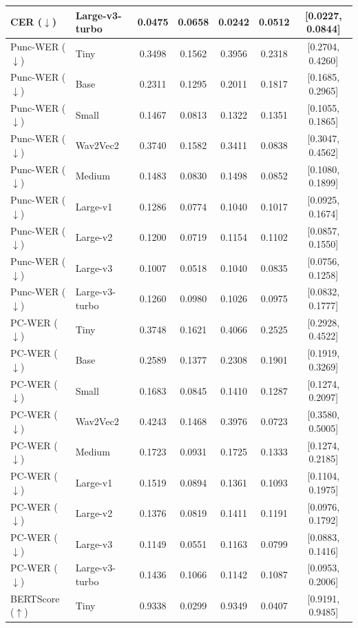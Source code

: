 \begin{table}[!t]
\begin{tabular}{llccccc}
CER ($\downarrow$) & Large-v3-turbo & 0.0475 & 0.0658 & 0.0242 & 0.0512 & [0.0227, 0.0844] \\
\midrule
Punc-WER ($\downarrow$) & Tiny & 0.3498 & 0.1562 & 0.3956 & 0.2318 & [0.2704, 0.4260] \\
Punc-WER ($\downarrow$) & Base & 0.2311 & 0.1295 & 0.2011 & 0.1817 & [0.1685, 0.2965] \\
Punc-WER ($\downarrow$) & Small & 0.1467 & 0.0813 & 0.1322 & 0.1351 & [0.1055, 0.1865] \\
Punc-WER ($\downarrow$) & Wav2Vec2 & 0.3740 & 0.1582 & 0.3411 & 0.0838 & [0.3047, 0.4562] \\
Punc-WER ($\downarrow$) & Medium & 0.1483 & 0.0830 & 0.1498 & 0.0852 & [0.1080, 0.1899] \\
Punc-WER ($\downarrow$) & Large-v1 & 0.1286 & 0.0774 & 0.1040 & 0.1017 & [0.0925, 0.1674] \\
Punc-WER ($\downarrow$) & Large-v2 & 0.1200 & 0.0719 & 0.1154 & 0.1102 & [0.0857, 0.1550] \\
Punc-WER ($\downarrow$) & Large-v3 & 0.1007 & 0.0518 & 0.1040 & 0.0835 & [0.0756, 0.1258] \\
Punc-WER ($\downarrow$) & Large-v3-turbo & 0.1260 & 0.0980 & 0.1026 & 0.0975 & [0.0832, 0.1777] \\
\midrule
PC-WER ($\downarrow$) & Tiny & 0.3748 & 0.1621 & 0.4066 & 0.2525 & [0.2928, 0.4522] \\
PC-WER ($\downarrow$) & Base & 0.2589 & 0.1377 & 0.2308 & 0.1901 & [0.1919, 0.3269] \\
PC-WER ($\downarrow$) & Small & 0.1683 & 0.0845 & 0.1410 & 0.1287 & [0.1274, 0.2097] \\
PC-WER ($\downarrow$) & Wav2Vec2 & 0.4243 & 0.1468 & 0.3976 & 0.0723 & [0.3580, 0.5005] \\
PC-WER ($\downarrow$) & Medium & 0.1723 & 0.0931 & 0.1725 & 0.1333 & [0.1274, 0.2185] \\
PC-WER ($\downarrow$) & Large-v1 & 0.1519 & 0.0894 & 0.1361 & 0.1093 & [0.1104, 0.1975] \\
PC-WER ($\downarrow$) & Large-v2 & 0.1376 & 0.0819 & 0.1411 & 0.1191 & [0.0976, 0.1792] \\
PC-WER ($\downarrow$) & Large-v3 & 0.1149 & 0.0551 & 0.1163 & 0.0799 & [0.0883, 0.1416] \\
PC-WER ($\downarrow$) & Large-v3-turbo & 0.1436 & 0.1066 & 0.1142 & 0.1087 & [0.0953, 0.2006] \\
\midrule
BERTScore ($\uparrow$) & Tiny & 0.9338 & 0.0299 & 0.9349 & 0.0407 & [0.9191, 0.9485] \\

\end{tabular}
\end{table}
